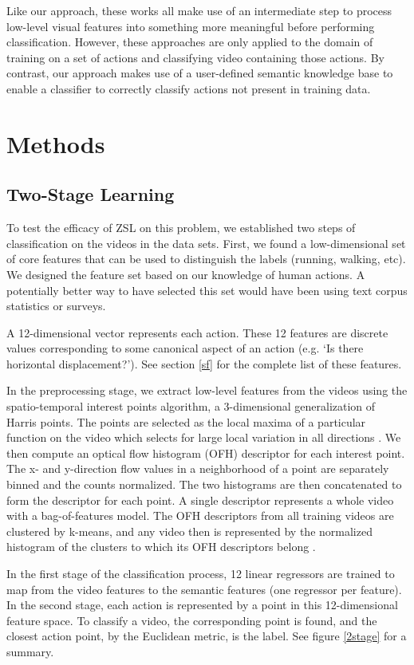 \documentclass{article}
\begin{document}
Like our approach, these works all make use of an intermediate step to process low-level visual features into something more meaningful before performing classification. However, these approaches are only applied to the domain of training on a set of actions and classifying video containing those actions. By contrast, our approach makes use of a user-defined semantic knowledge base to enable a classifier to correctly classify actions not present in training data.

\section{Methods}
\subsection{Two-Stage Learning}
To test the efficacy of ZSL on this problem, we established two steps of classification on the videos in the data sets. First, we found a low-dimensional set of core features that can be used to distinguish the labels (running, walking, etc). We designed the feature set based on our knowledge of human actions. A potentially better way to have selected this set would have been using text corpus statistics or surveys.

A 12-dimensional vector represents each action. These 12 features are discrete values corresponding to some canonical aspect of an action (e.g. `Is there horizontal displacement?'). See section \ref{sf} for the complete list of these features.

In the preprocessing stage, we extract low-level features from the videos using the spatio-temporal interest points algorithm, a 3-dimensional generalization of Harris points. The points are selected as the local maxima of a particular function on the video which selects for large local variation in all directions \cite{Laptev05}. We then compute an optical flow histogram (OFH) descriptor for each interest point. The x- and y-direction flow values in a neighborhood of a point are separately binned and the counts normalized. The two histograms are then concatenated to form the descriptor for each point. A single descriptor represents a whole video with a bag-of-features model. The OFH descriptors from all training videos are clustered by k-means, and any video then is represented by the normalized histogram of the clusters to which its OFH descriptors belong \cite{Laptev04}.

In the first stage of the classification process, 12 linear regressors are trained to map from the video features to the semantic features (one regressor per feature). In the second stage, each action is represented by a point in this 12-dimensional feature space. To classify a video, the corresponding point is found, and the closest action point, by the Euclidean metric, is the label. See figure \ref{2stage} for a summary.
\end{document}
